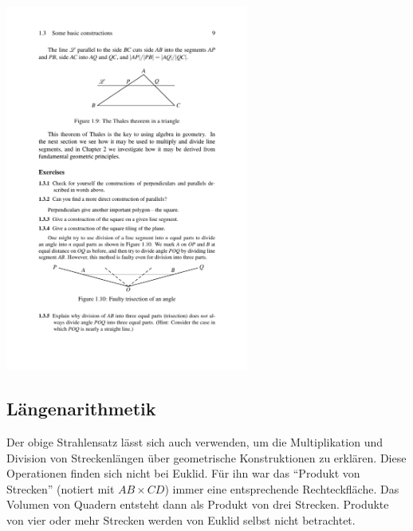 \begin{center}
    \includegraphics[width=8cm]{BILDER/BildStrahlensatz.pdf}
\end{center}

\subsection*{Längenarithmetik}

Der obige Strahlensatz lässt sich auch verwenden, um die Multiplikation und Division von
Streckenlängen über geometrische Konstruktionen zu erklären. Diese Operationen finden sich nicht
bei Euklid. Für ihn war das "`Produkt von Strecken"' (notiert mit $AB \times CD$)
immer eine entsprechende Rechteckfläche. Das Volumen von Quadern entsteht dann als Produkt von drei
Strecken. Produkte von vier oder mehr Strecken werden von Euklid selbst nicht betrachtet.

